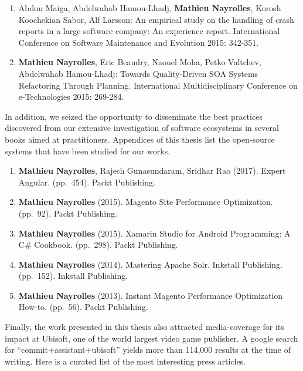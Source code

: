 \documentclass[12pt]{report}
\begin{document}
\begin{enumerate}
\def\labelenumi{\arabic{enumi}.}
\setcounter{enumi}{6}
\item
  Abdou Maiga, Abdelwahab Hamou-Lhadj, \textbf{Mathieu Nayrolles},
  Korosh Koochekian Sabor, Alf Larsson: An empirical study on the
  handling of crash reports in a large software company: An experience
  report. International Conference on Software Maintenance and Evolution
  2015: 342-351.
\item
  \textbf{Mathieu Nayrolles}, Eric Beaudry, Naouel Moha, Petko Valtchev,
  Abdelwahab Hamou-Lhadj: Towards Quality-Driven SOA Systems Refactoring
  Through Planning. International Multidisciplinary Conference on
  e-Technologies 2015: 269-284.
\end{enumerate}

In addition, we seized the opportunity to disseminate the best practices
discovered from our extensive investigation of software ecosystems in
several books aimed at practitioners. Appendices of this thesis list the
open-source systems that have been studied for our works.

\begin{enumerate}
\def\labelenumi{\arabic{enumi}.}
\setcounter{enumi}{8}
\item
  \textbf{Mathieu Nayrolles}, Rajesh Gunasundaram, Sridhar Rao (2017).
  Expert Angular. (pp.~454). Packt Publishing.
\item
  \textbf{Mathieu Nayrolles} (2015). Magento Site Performance
  Optimization. (pp.~92). Packt Publishing.
\item
  \textbf{Mathieu Nayrolles} (2015). Xamarin Studio for Android
  Programming: A C\# Cookbook. (pp.~298). Packt Publishing.
\item
  \textbf{Mathieu Nayrolles} (2014). Mastering Apache Solr. Inkstall
  Publishing. (pp.~152). Inkstall Publishing.
\item
  \textbf{Mathieu Nayrolles} (2013). Instant Magento Performance
  Optimization How-to. (pp.~56). Packt Publishing.
\end{enumerate}

Finally, the work presented in this thesis also attracted media-coverage
for its impact at Ubisoft, one of the world largest video game
publisher. A google search for ``commit+assistant+ubisoft'' yields more
than 114,000 results at the time of writing. Here is a curated list of
the most interesting press articles.
\end{document}
